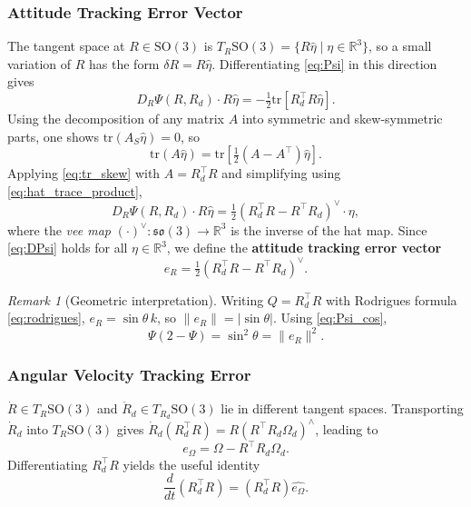 \documentclass[11pt]{article}
\theoremstyle{remark}
\newtheorem{remark}{Remark}
\newcommand{\SO}{\mathrm{SO}(3)}
\newcommand{\so}{\mathfrak{so}(3)}
\newcommand{\R}{\mathbb{R}}
\newcommand{\tr}{\mathrm{tr}}
\newcommand{\hatmap}[1]{\widehat{#1}}
\newcommand{\hatexp}[1]{({#1})^\wedge}
\begin{document}
\subsubsection{Attitude Tracking Error Vector}
The tangent space at $R \in \SO$ is $T_R\SO = \{R\hatmap{\eta} \mid \eta \in \R^3\}$, so a small variation of $R$ has the form $\delta R = R\hatmap{\eta}$. Differentiating \eqref{eq:Psi} in this direction gives
\[
D_R\Psi(R, R_d) \cdot R\hatmap{\eta}
= -\tfrac{1}{2}\tr\!\left[R_d^\top R\hatmap{\eta}\right].
\]
Using the decomposition of any matrix $A$ into symmetric and skew-symmetric parts, one shows $\tr(A_S\hatmap{\eta}) = 0$, so
\begin{equation}
\tr(A\hatmap{\eta}) = \tr\!\left[\tfrac{1}{2}(A - A^\top)\hatmap{\eta}\right].
\label{eq:tr_skew}
\end{equation}
Applying \eqref{eq:tr_skew} with $A = R_d^\top R$ and simplifying using \eqref{eq:hat_trace_product},
\begin{equation}
D_R \Psi(R, R_d) \cdot R\hatmap{\eta} = \tfrac{1}{2}(R_d^\top R - R^\top R_d)^\vee \cdot \eta,
\label{eq:DPsi}
\end{equation}
where the \emph{vee map} $(\cdot)^\vee : \so \to \R^3$ is the inverse of the hat map. Since \eqref{eq:DPsi} holds for all $\eta \in \R^3$, we define the \textbf{attitude tracking error vector}
\begin{equation}
e_R = \tfrac{1}{2}(R_d^\top R - R^\top R_d)^\vee.
\label{eq:eR}
\end{equation}

\begin{remark}[Geometric interpretation]
\label{remark:geom_interp}
Writing $Q = R_d^\top R$ with Rodrigues formula \eqref{eq:rodrigues}, $e_R = \sin\theta\, k$, so $\|e_R\| = |\sin\theta|$. Using \eqref{eq:Psi_cos},
\begin{equation}
\Psi(2 - \Psi) = \sin^2\theta = \|e_R\|^2.
\label{eq:Psi_eR}
\end{equation}
\end{remark}

\subsubsection{Angular Velocity Tracking Error}
$\dot R \in T_R\SO$ and $\dot R_d \in T_{R_d}\SO$ lie in different tangent spaces. Transporting $\dot R_d$ into $T_R\SO$ gives $\dot R_d(R_d^\top R) = R\hatexp{R^\top R_d \Omega_d}$, leading to
\begin{equation}
e_\Omega = \Omega - R^\top R_d \Omega_d.
\label{eq:eOm}
\end{equation}
Differentiating $R_d^\top R$ yields the useful identity
\begin{equation}
\frac{d}{dt}(R_d^\top R) = (R_d^\top R)\hatmap{e_\Omega}.
\label{eq:RdTR_dot}
\end{equation}
\end{document}
